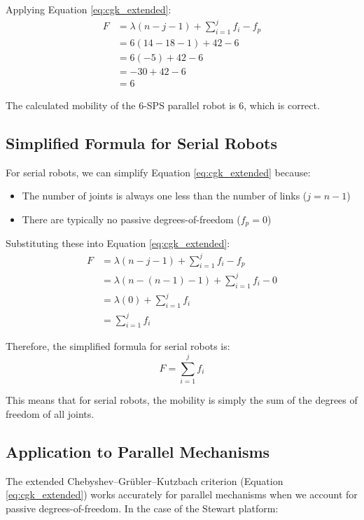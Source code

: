 \begin{solution}
    Applying Equation \ref{eq:cgk_extended}:
    \begin{align*}
        F &= \lambda(n - j - 1) + \sum_{i=1}^j f_i - f_p \\
          &= 6(14 - 18 - 1) + 42 - 6 \\
          &= 6(-5) + 42 - 6 \\
          &= -30 + 42 - 6 \\
          &= 6
    \end{align*}

    The calculated mobility of the 6-SPS parallel robot is 6, which is correct.

    \subsection*{Simplified Formula for Serial Robots}
    For serial robots, we can simplify Equation \ref{eq:cgk_extended} because:
    \begin{itemize}
        \item The number of joints is always one less than the number of links ($j = n - 1$)
        \item There are typically no passive degrees-of-freedom ($f_p = 0$)
    \end{itemize}

    Substituting these into Equation \ref{eq:cgk_extended}:
    \begin{align*}
        F &= \lambda(n - j - 1) + \sum_{i=1}^j f_i - f_p \\
          &= \lambda(n - (n-1) - 1) + \sum_{i=1}^j f_i - 0 \\
          &= \lambda(0) + \sum_{i=1}^j f_i \\
          &= \sum_{i=1}^j f_i
    \end{align*}

    Therefore, the simplified formula for serial robots is:
    \begin{equation}
        F = \sum_{i=1}^j f_i
        \label{eq:serial_mobility}
    \end{equation}

    This means that for serial robots, the mobility is simply the sum of the degrees of freedom of all joints.

    \subsection*{Application to Parallel Mechanisms}
    The extended Chebyshev–Grübler–Kutzbach criterion (Equation \ref{eq:cgk_extended}) works accurately for parallel mechanisms when we account for passive degrees-of-freedom. In the case of the Stewart platform:


\end{solution}
